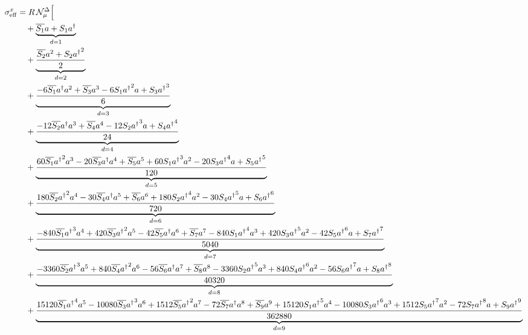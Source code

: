 \begin{align}
\sigma^{x}_{\rm eff} &= R\,\mathcal N^{\Delta}_{\mu}\Bigl[ \\
  &\quad + \underbrace{\overline{{S}_{1}} {a} + {S}_{1} {{a}^\dagger}}_{d=1} \\
  &\quad + \underbrace{\frac{\overline{{S}_{2}} {a}^{2} + {S}_{2} {{a}^\dagger}^{2}}{2}}_{d=2} \\
  &\quad + \underbrace{\frac{- 6 \overline{{S}_{1}} {{a}^\dagger} {a}^{2} + \overline{{S}_{3}} {a}^{3} - 6 {S}_{1} {{a}^\dagger}^{2} {a} + {S}_{3} {{a}^\dagger}^{3}}{6}}_{d=3} \\
  &\quad + \underbrace{\frac{- 12 \overline{{S}_{2}} {{a}^\dagger} {a}^{3} + \overline{{S}_{4}} {a}^{4} - 12 {S}_{2} {{a}^\dagger}^{3} {a} + {S}_{4} {{a}^\dagger}^{4}}{24}}_{d=4} \\
  &\quad + \underbrace{\frac{60 \overline{{S}_{1}} {{a}^\dagger}^{2} {a}^{3} - 20 \overline{{S}_{3}} {{a}^\dagger} {a}^{4} + \overline{{S}_{5}} {a}^{5} + 60 {S}_{1} {{a}^\dagger}^{3} {a}^{2} - 20 {S}_{3} {{a}^\dagger}^{4} {a} + {S}_{5} {{a}^\dagger}^{5}}{120}}_{d=5} \\
  &\quad + \underbrace{\frac{180 \overline{{S}_{2}} {{a}^\dagger}^{2} {a}^{4} - 30 \overline{{S}_{4}} {{a}^\dagger} {a}^{5} + \overline{{S}_{6}} {a}^{6} + 180 {S}_{2} {{a}^\dagger}^{4} {a}^{2} - 30 {S}_{4} {{a}^\dagger}^{5} {a} + {S}_{6} {{a}^\dagger}^{6}}{720}}_{d=6} \\
  &\quad + \underbrace{\frac{- 840 \overline{{S}_{1}} {{a}^\dagger}^{3} {a}^{4} + 420 \overline{{S}_{3}} {{a}^\dagger}^{2} {a}^{5} - 42 \overline{{S}_{5}} {{a}^\dagger} {a}^{6} + \overline{{S}_{7}} {a}^{7} - 840 {S}_{1} {{a}^\dagger}^{4} {a}^{3} + 420 {S}_{3} {{a}^\dagger}^{5} {a}^{2} - 42 {S}_{5} {{a}^\dagger}^{6} {a} + {S}_{7} {{a}^\dagger}^{7}}{5040}}_{d=7} \\
  &\quad + \underbrace{\frac{- 3360 \overline{{S}_{2}} {{a}^\dagger}^{3} {a}^{5} + 840 \overline{{S}_{4}} {{a}^\dagger}^{2} {a}^{6} - 56 \overline{{S}_{6}} {{a}^\dagger} {a}^{7} + \overline{{S}_{8}} {a}^{8} - 3360 {S}_{2} {{a}^\dagger}^{5} {a}^{3} + 840 {S}_{4} {{a}^\dagger}^{6} {a}^{2} - 56 {S}_{6} {{a}^\dagger}^{7} {a} + {S}_{8} {{a}^\dagger}^{8}}{40320}}_{d=8} \\
  &\quad + \underbrace{\frac{15120 \overline{{S}_{1}} {{a}^\dagger}^{4} {a}^{5} - 10080 \overline{{S}_{3}} {{a}^\dagger}^{3} {a}^{6} + 1512 \overline{{S}_{5}} {{a}^\dagger}^{2} {a}^{7} - 72 \overline{{S}_{7}} {{a}^\dagger} {a}^{8} + \overline{{S}_{9}} {a}^{9} + 15120 {S}_{1} {{a}^\dagger}^{5} {a}^{4} - 10080 {S}_{3} {{a}^\dagger}^{6} {a}^{3} + 1512 {S}_{5} {{a}^\dagger}^{7} {a}^{2} - 72 {S}_{7} {{a}^\dagger}^{8} {a} + {S}_{9} {{a}^\dagger}^{9}}{362880}}_{d=9} \\

\end{align}

